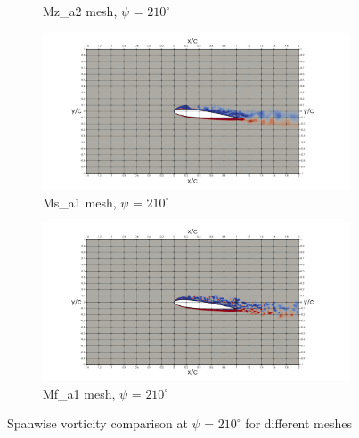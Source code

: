 \begin{figure}[H]
\begin{subfigure}[b]{0.475\textwidth}
\caption{Mz\_a2 mesh, $\psi$ = $210^\circ$}
\label{fig:Ma2_psi210}
\end{subfigure}
\begin{subfigure}[b]{0.475\textwidth}
\centering
\includegraphics[width=1.25\textwidth]{figures/vorticity_plots/SB/ph_210.png}
\caption{Ms\_a1 mesh, $\psi$ = $210^\circ$}
\label{fig:hadapt_psi210}
\end{subfigure}
\begin{subfigure}[b]{0.475\textwidth}
\centering
\includegraphics[width=1.25\textwidth]{figures/vorticity_plots/FB/ph_210.png}
\caption{Mf\_a1 mesh, $\psi$ = $210^\circ$}
\label{fig:FB_psi210}
\end{subfigure}
\caption{Spanwise vorticity comparison at $\psi$ = $210^\circ$ for different meshes}
\label{fig:vorticity_210}
\end{figure}



